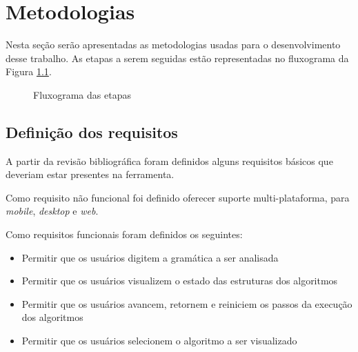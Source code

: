 \chapter{Metodologias}
\label{chap:metodologia}
Nesta seção serão apresentadas as metodologias usadas para o desenvolvimento desse trabalho. As etapas a serem seguidas estão representadas no fluxograma da Figura \ref{fig:etapas}.

\begin{figure}[ht]
  \centering
  \captionsetup{width=16cm}
  \caption{Fluxograma das etapas}
  \label{fig:etapas}
\end{figure}
\FloatBarrier

\section{Definição dos requisitos}
A partir da revisão bibliográfica foram definidos alguns requisitos básicos que deveriam estar presentes na ferramenta. 

Como requisito não funcional foi definido oferecer suporte multi-plataforma, para \textit{mobile}, \textit{desktop} e \textit{web}. 

Como requisitos funcionais foram definidos os seguintes:
\begin{itemize}[label={$\sbullet$}]
    \item Permitir que os usuários digitem a gramática a ser analisada
    \item Permitir que os usuários visualizem o estado das estruturas dos algoritmos
    \item Permitir que os usuários avancem, retornem e reiniciem os passos da execução dos algoritmos  
    \item Permitir que os usuários selecionem o algoritmo a ser visualizado
\end{itemize}
 
